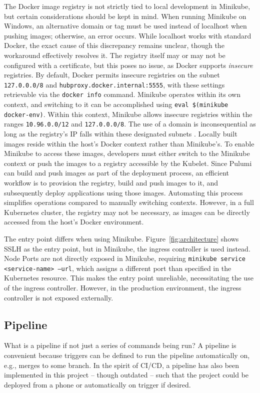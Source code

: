 The Docker image registry is not strictly tied to local development in Minikube, but certain considerations should be kept in mind. When running Minikube on Windows, an alternative domain or tag must be used instead of localhost when pushing images; otherwise, an error occurs. While localhost works with standard Docker, the exact cause of this discrepancy remains unclear, though the workaround effectively resolves it. The registry itself may or may not be configured with a certificate, but this poses no issue, as Docker supports \textit{insecure} registries. By default, Docker permits insecure registries on the subnet \texttt{127.0.0.0/8} and \texttt{hubproxy.docker.internal:5555}, with these settings retrievable via the \texttt{docker info} command. Minikube operates within its own context, and switching to it can be accomplished using \texttt{eval \$(minikube docker-env)}. Within this context, Minikube allows insecure registries within the ranges \texttt{10.96.0.0/12} and \texttt{127.0.0.0/8}. The use of a domain is inconsequential as long as the registry's IP falls within these designated subnets \Parencite{dockerInsecureRegistries}. Locally built images reside within the host's Docker context rather than Minikube's. To enable Minikube to access these images, developers must either switch to the Minikube context or push the images to a registry accessible by the Kubelet. Since Pulumi can build and push images as part of the deployment process, an efficient workflow is to provision the registry, build and push images to it, and subsequently deploy applications using those images. Automating this process simplifies operations compared to manually switching contexts. However, in a full Kubernetes cluster, the registry may not be necessary, as images can be directly accessed from the host's Docker environment.

The entry point differs when using Minikube. Figure~\ref{fig:architecture} shows SSLH as the entry point, but in Minikube, the ingress controller is used instead. Node Ports are not directly exposed in Minikube, requiring \texttt{minikube service <service-name> --url}, which assigns a different port than specified in the Kubernetes resource. This makes the entry point unreliable, necessitating the use of the ingress controller. However, in the production environment, the ingress controller is not exposed externally.

\subsection{Pipeline}
What is a pipeline if not just a series of commands being run? A pipeline is convenient because triggers can be defined to run the pipeline automatically on, e.g., merges to some branch. In the spirit of CI/CD, a pipeline has also been implemented in this project -- though outdated -- such that the project could be deployed from a phone or automatically on trigger if desired.

